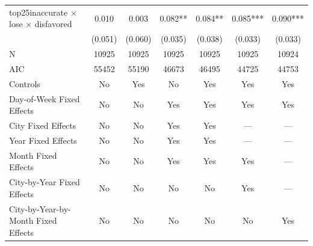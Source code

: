 \begin{table}
\begin{tabular}[t]{lcccccc}
\midrule \hspace{1em}top25inaccurate × lose × disfavored & 0.010 & 0.003 & 0.082** & 0.084** & 0.085*** & 0.090***\\
\hspace{1em} & (0.051) & (0.060) & (0.035) & (0.038) & (0.033) & (0.033)\\
\hspace{1em}N & 10925 & 10925 & 10925 & 10925 & 10925 & 10924\\
\hspace{1em}AIC & 55452 & 55190 & 46673 & 46495 & 44725 & 44753\\
Controls & No & Yes & No & Yes & Yes & Yes\\
Day-of-Week Fixed Effects & No & No & Yes & Yes & Yes & Yes\\
City Fixed Effects & No & No & Yes & Yes & — & —\\
Year Fixed Effects & No & No & Yes & Yes & — & —\\
Month Fixed Effects & No & No & Yes & Yes & Yes & —\\
City-by-Year Fixed Effects & No & No & No & No & Yes & —\\
City-by-Year-by-Month Fixed Effects & No & No & No & No & No & Yes\\
\bottomrule
\end{tabular}
\end{table}
